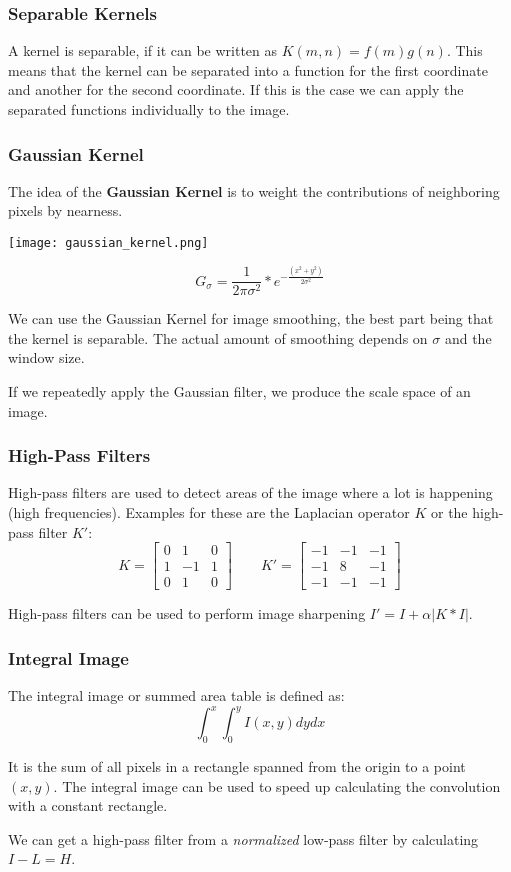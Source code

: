 \subsubsection{Separable Kernels}

A kernel is separable, if it can be written as $K(m, n) = f(m) g(n)$. This means that the kernel can be separated into a function for the first coordinate and another for the second coordinate. If this is the case we can apply the separated functions individually to the image.

\subsubsection{Gaussian Kernel}

The idea of the \textbf{Gaussian Kernel} is to weight the contributions of neighboring pixels by nearness.

\begin{center}
	\texttt{[image: gaussian\_kernel.png]}
\end{center}
$$G_\sigma = \frac{1}{2 \pi \sigma^2} * e^{- \frac{(x^2 + y^2)}{2 \sigma^2}}$$

We can use the Gaussian Kernel for image smoothing, the best part being that the kernel is separable. The actual amount of smoothing depends on $\sigma$ and the window size. \medskip

If we repeatedly apply the Gaussian filter, we produce the scale space of an image.

\subsubsection{High-Pass Filters}

High-pass filters are used to detect areas of the image where a lot is happening (high frequencies). Examples for these are the Laplacian operator $K$ or the high-pass filter $K'$:
$$ K = 
\begin{bmatrix}
    0 & 1 & 0\\
    1 & -1 & 1\\
    0 & 1 & 0
\end{bmatrix}
\qquad
K' =
\begin{bmatrix}
    -1 & -1 & -1\\
    -1 & 8 & -1\\
    -1 & -1 & -1
\end{bmatrix}
$$

High-pass filters can be used to perform image sharpening $I' = I + \alpha |K * I|$.

\subsubsection{Integral Image}

The integral image or summed area table is defined as:
$$\int_0^x \int_0^y I(x,y)dydx$$

It is the sum of all pixels in a rectangle spanned from the origin to a point $(x,y)$. The integral image can be used to speed up calculating the convolution with a constant rectangle. \medskip

We can get a high-pass filter from a \textit{normalized} low-pass filter by calculating $I - L = H$.
